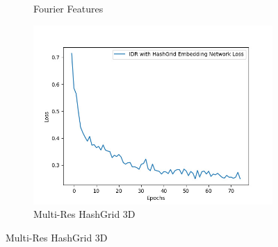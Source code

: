 \begin{figure}[H]
\begin{subfigure}{0.3\textwidth}
        \caption*{Fourier Features}
      \end{subfigure}
      \begin{subfigure}{0.3\textwidth}
        \includegraphics[width=\linewidth]{images/chapter5_img/LossPlots/Total_Loss_First_50-100_Epochs/loss_plot_HashGrid_EpochStamp75.jpg}
        \caption*{Multi-Res HashGrid 3D}
      \end{subfigure}
    

\end{figure}
